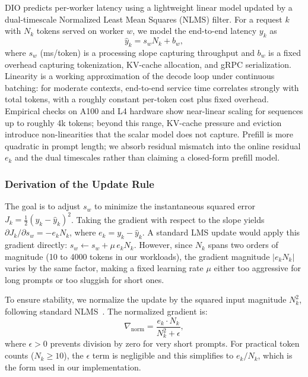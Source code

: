 \documentclass[10pt,twocolumn,letterpaper]{article}
\begin{document}
DIO predicts per-worker latency using a lightweight linear model updated by a dual-timescale Normalized Least Mean Squares (NLMS) filter.
For a request $k$ with $N_k$ tokens served on worker $w$, we model the end-to-end latency $y_k$ as
\begin{equation}
    \hat{y}_k = s_w N_k + b_w, \label{eq:model}
\end{equation}
where $s_w$ (ms/token) is a processing slope capturing throughput and $b_w$ is a fixed overhead capturing tokenization, KV-cache allocation, and gRPC serialization.
Linearity is a working approximation of the decode loop under continuous batching: for moderate contexts, end-to-end service time correlates strongly with total tokens, with a roughly constant per-token cost plus fixed overhead. Empirical checks on A100 and L4 hardware show near-linear scaling for sequences up to roughly 4k tokens; beyond this range, KV-cache pressure and eviction introduce non-linearities that the scalar model does not capture. Prefill is more quadratic in prompt length; we absorb residual mismatch into the online residual $e_k$ and the dual timescales rather than claiming a closed-form prefill model.

\subsubsection{Derivation of the Update Rule}
The goal is to adjust $s_w$ to minimize the instantaneous squared error $J_k = \tfrac{1}{2}(y_k - \hat{y}_k)^2$. Taking the gradient with respect to the slope yields $\partial J_k / \partial s_w = -e_k N_k$, where $e_k = y_k - \hat{y}_k$. A standard LMS update would apply this gradient directly: $s_w \leftarrow s_w + \mu\, e_k N_k$. However, since $N_k$ spans two orders of magnitude (10 to 4000 tokens in our workloads), the gradient magnitude $|e_k N_k|$ varies by the same factor, making a fixed learning rate $\mu$ either too aggressive for long prompts or too sluggish for short ones.

To ensure stability, we normalize the update by the squared input magnitude $N_k^2$, following standard NLMS~\cite{haykin2002adaptive}. The normalized gradient is:
\begin{equation}
    \nabla_{\text{norm}} = \frac{e_k \cdot N_k}{N_k^2 + \epsilon}, \label{eq:norm}
\end{equation}
where $\epsilon > 0$ prevents division by zero for very short prompts. For practical token counts ($N_k \geq 10$), the $\epsilon$ term is negligible and this simplifies to $e_k / N_k$, which is the form used in our implementation.
\end{document}
